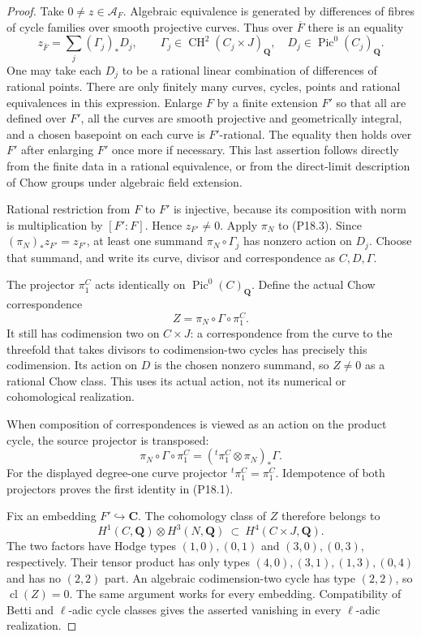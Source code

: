 \begin{proof}
Take $0\ne z\in\mathcal A_F$. Algebraic equivalence is generated
by differences of fibres of cycle families over smooth projective
curves. Thus over $\overline F$ there is an equality
\[
 z_{\overline F}=\sum_j(\Gamma_j)_*D_j,
 \qquad
 \Gamma_j\in\operatorname{CH}^2(C_j\times J)_{\mathbf Q},
 \quad D_j\in\operatorname{Pic}^0(C_j)_{\mathbf Q}.
                                                        \tag{P18.3}
\]
One may take each $D_j$ to be a rational linear combination of
differences of rational points. There are only finitely many
curves, cycles, points and rational equivalences in this
expression. Enlarge $F$ by a finite extension $F'$ so that all
are defined over $F'$, all the curves are smooth projective and
geometrically integral, and a chosen basepoint on each curve is
$F'$-rational. The equality then holds over $F'$ after enlarging
$F'$ once more if necessary. This last assertion follows directly
from the finite data in a rational equivalence, or from the
direct-limit description of Chow groups under algebraic field
extension.

Rational restriction from $F$ to $F'$ is injective, because its
composition with norm is multiplication by $[F':F]$.
Hence $z_{F'}\ne0$. Apply $\pi_N$ to (P18.3). Since
$(\pi_N)_*z_{F'}=z_{F'}$, at least one summand
$\pi_N\circ\Gamma_j$ has nonzero action on $D_j$. Choose that
summand, and write its curve, divisor and correspondence as
$C,D,\Gamma$.

The projector $\pi_1^C$ acts identically on
$\operatorname{Pic}^0(C)_{\mathbf Q}$. Define the actual Chow
correspondence
\[
              Z=\pi_N\circ\Gamma\circ\pi_1^C.
                                                        \tag{P18.4}
\]
It still has codimension two on $C\times J$: a correspondence
from the curve to the threefold that takes divisors to
codimension-two cycles has precisely this codimension.
Its action on $D$ is the chosen nonzero summand, so $Z\ne0$ as
a rational Chow class. This uses its actual action, not its
numerical or cohomological realization.

When composition of correspondences is viewed as an action on
the product cycle, the source projector is transposed:
\[
 \pi_N\circ\Gamma\circ\pi_1^C
       =({}^t\pi_1^C\otimes\pi_N)_*\Gamma.
\]
For the displayed degree-one curve projector
${}^t\pi_1^C=\pi_1^C$. Idempotence of both projectors proves
the first identity in (P18.1).

Fix an embedding $F'\hookrightarrow\mathbf C$. The cohomology
class of $Z$ therefore belongs to
\[
 H^1(C,\mathbf Q)\otimes H^3(N,\mathbf Q)
       \ \subset\ H^4(C\times J,\mathbf Q).
\]
The two factors have Hodge types $(1,0),(0,1)$ and
$(3,0),(0,3)$, respectively. Their tensor product has only types
$(4,0),(3,1),(1,3),(0,4)$ and has no $(2,2)$ part. An algebraic
codimension-two cycle has type $(2,2)$, so
$\operatorname{cl}(Z)=0$. The same argument works for every
embedding. Compatibility of Betti and $\ell$-adic cycle classes
gives the asserted vanishing in every $\ell$-adic realization.


\end{proof}
